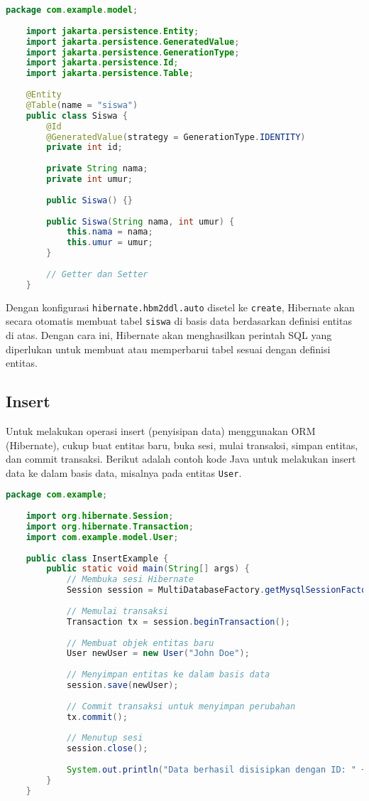 \begin{lstlisting}[language=Java, style=JavaStyle]
	package com.example.model;
	
	import jakarta.persistence.Entity;
	import jakarta.persistence.GeneratedValue;
	import jakarta.persistence.GenerationType;
	import jakarta.persistence.Id;
	import jakarta.persistence.Table;
	
	@Entity
	@Table(name = "siswa")
	public class Siswa {
		@Id
		@GeneratedValue(strategy = GenerationType.IDENTITY)
		private int id;
		
		private String nama;
		private int umur;
		
		public Siswa() {}
		
		public Siswa(String nama, int umur) {
			this.nama = nama;
			this.umur = umur;
		}
		
		// Getter dan Setter
	}
\end{lstlisting}

Dengan konfigurasi \texttt{hibernate.hbm2ddl.auto} disetel ke \texttt{create}, Hibernate akan secara otomatis membuat tabel \texttt{siswa} di basis data berdasarkan definisi entitas di atas. Dengan cara ini, Hibernate akan menghasilkan perintah SQL yang diperlukan untuk membuat atau memperbarui tabel sesuai dengan definisi entitas.


\subsection{Insert}

Untuk melakukan operasi insert (penyisipan data) menggunakan ORM (Hibernate), cukup buat entitas baru, buka sesi, mulai transaksi, simpan entitas, dan commit transaksi. Berikut adalah contoh kode Java untuk melakukan insert data ke dalam basis data, misalnya pada entitas \texttt{User}.

\begin{lstlisting}[language=Java, style=JavaStyle]
	package com.example;
	
	import org.hibernate.Session;
	import org.hibernate.Transaction;
	import com.example.model.User;
	
	public class InsertExample {
		public static void main(String[] args) {
			// Membuka sesi Hibernate
			Session session = MultiDatabaseFactory.getMysqlSessionFactory().openSession();
			
			// Memulai transaksi
			Transaction tx = session.beginTransaction();
			
			// Membuat objek entitas baru
			User newUser = new User("John Doe");
			
			// Menyimpan entitas ke dalam basis data
			session.save(newUser);
			
			// Commit transaksi untuk menyimpan perubahan
			tx.commit();
			
			// Menutup sesi
			session.close();
			
			System.out.println("Data berhasil disisipkan dengan ID: " + newUser.getId());
		}
	}
\end{lstlisting}

